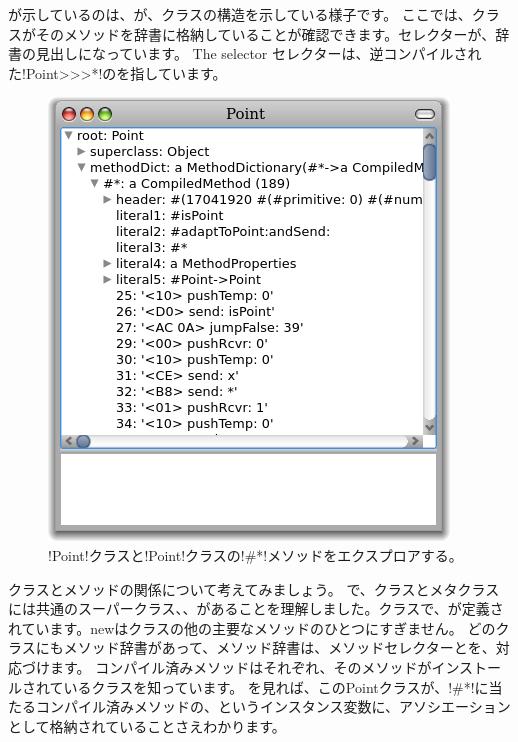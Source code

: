 \documentclass[a4paper,10pt,twoside]{book}
\begin{document}

が示しているのは、が、クラスの構造を示している様子です。
ここでは、クラスがそのメソッドを辞書に格納していることが確認できます。セレクターが、辞書の見出しになっています。
The selector \ct{#*}セレクターは、逆コンパイルされた\ct!Point>>>*!のを指しています。

\begin{figure}[ht]\centering
	\includegraphics[width=.5\linewidth]{CompiledMethod}
	\caption{\ct!Point!クラスと\ct!Point!クラスの\ct!\#*!メソッドをエクスプロアする。} %
\end{figure}

クラスとメソッドの関係について考えてみましょう。
で、クラスとメタクラスには共通のスーパークラス、、があることを理解しました。クラスで、が定義されています。newはクラスの他の主要なメソッドのひとつにすぎません。%
どのクラスにもメソッド辞書があって、メソッド辞書は、メソッドセレクターとを、対応づけます。
コンパイル済みメソッドはそれぞれ、そのメソッドがインストールされているクラスを知っています。
を見れば、このPointクラスが、\ct!\#*!に当たるコンパイル済みメソッドの、というインスタンス変数に、アソシエーションとして格納されていることさえわかります。
\end{document}
